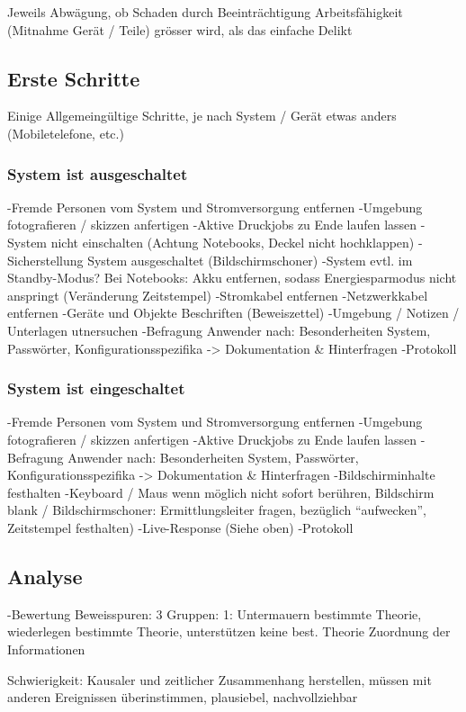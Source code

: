 Jeweils Abwägung, ob Schaden durch Beeinträchtigung Arbeitsfähigkeit (Mitnahme Gerät / Teile) grösser wird, als das einfache Delikt

\subsection{Erste Schritte}
Einige Allgemeingültige Schritte, je nach System / Gerät etwas anders (Mobiletelefone, etc.)

\subsubsection{System ist ausgeschaltet}
-Fremde Personen vom System und Stromversorgung entfernen
-Umgebung fotografieren / skizzen anfertigen
-Aktive Druckjobs zu Ende laufen lassen
-System nicht einschalten (Achtung Notebooks, Deckel nicht hochklappen)
-Sicherstellung System ausgeschaltet (Bildschirmschoner)
-System evtl. im Standby-Modus? Bei Notebooks: Akku entfernen, sodass Energiesparmodus nicht anspringt (Veränderung Zeitstempel)
-Stromkabel entfernen
-Netzwerkkabel entfernen
-Geräte und Objekte Beschriften (Beweiszettel)
-Umgebung / Notizen / Unterlagen utnersuchen
-Befragung Anwender nach: Besonderheiten System, Passwörter, Konfigurationsspezifika -> Dokumentation \& Hinterfragen
-Protokoll


\subsubsection{System ist eingeschaltet}
-Fremde Personen vom System und Stromversorgung entfernen
-Umgebung fotografieren / skizzen anfertigen
-Aktive Druckjobs zu Ende laufen lassen
-Befragung Anwender nach: Besonderheiten System, Passwörter, Konfigurationsspezifika -> Dokumentation \& Hinterfragen
-Bildschirminhalte festhalten
-Keyboard / Maus wenn möglich nicht sofort berühren, Bildschirm blank / Bildschirmschoner: Ermittlungsleiter fragen, bezüglich "`aufwecken"', Zeitstempel festhalten)
-Live-Response (Siehe oben)
-Protokoll

\subsection{Analyse}
-Bewertung Beweisspuren: 3 Gruppen: 1: Untermauern bestimmte Theorie, wiederlegen bestimmte Theorie, unterstützen keine best. Theorie
Zuordnung der Informationen

Schwierigkeit: Kausaler und zeitlicher Zusammenhang herstellen, müssen mit anderen Ereignissen überinstimmen, plausiebel, nachvollziehbar

